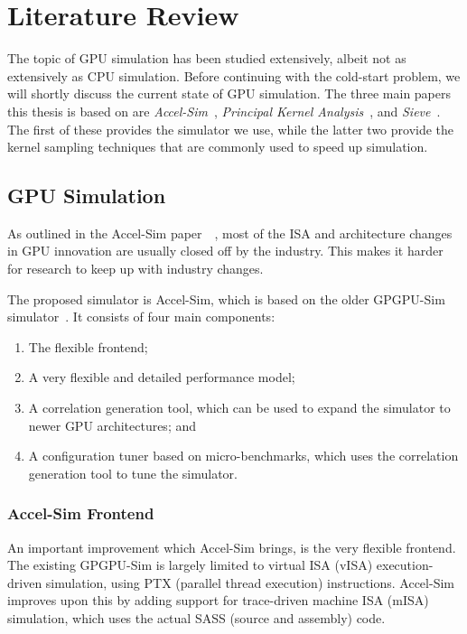 \chapter{Literature Review}\label{ch:literature-review}
The topic of GPU simulation has been studied extensively, albeit not as extensively as CPU simulation.
Before continuing with the cold-start problem, we will shortly discuss the current state of GPU simulation.
The three main papers this thesis is based on are \textit{Accel-Sim}~\cite{accelsim}, \textit{Principal Kernel Analysis}~\cite{pks}, and \textit{Sieve}~\cite{sieve}.
The first of these provides the simulator we use, while the latter two provide the kernel sampling techniques that are commonly used to speed up simulation.

\section{GPU Simulation}\label{sec:gpu-simulation}
As outlined in the Accel-Sim paper\ ~\cite{accelsim}, most of the ISA and architecture changes in GPU innovation are usually closed off by the industry.
This makes it harder for research to keep up with industry changes.

The proposed simulator is Accel-Sim, which is based on the older GPGPU-Sim simulator~\cite{gpgpu-sim}.
It consists of four main components:
\begin{enumerate}
    \item The flexible frontend;
    \item A very flexible and detailed performance model;
    \item A correlation generation tool, which can be used to expand the simulator to newer GPU architectures; and
    \item A configuration tuner based on micro-benchmarks, which uses the correlation generation tool to tune the simulator.
\end{enumerate}


\subsection{Accel-Sim Frontend}\label{subsec:accelsim-frontend}
An important improvement which Accel-Sim brings, is the very flexible frontend.
The existing GPGPU-Sim is largely limited to virtual ISA (vISA) execution-driven simulation, using PTX (parallel thread execution) instructions.
Accel-Sim improves upon this by adding support for trace-driven machine ISA (mISA) simulation, which uses the actual SASS (source and assembly) code.


